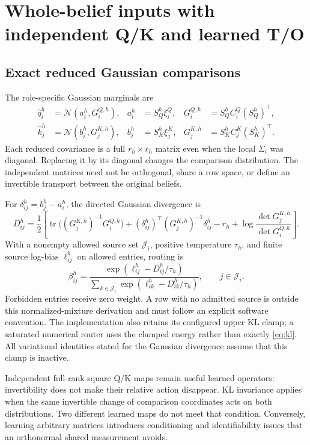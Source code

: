 \documentclass[11pt,letterpaper]{article}
\newcommand{\tr}{\operatorname{tr}}
\begin{document}
\section{Whole-belief inputs with independent Q/K and learned T/O}
\subsection{Exact reduced Gaussian comparisons}
The role-specific Gaussian marginals are
\begin{align}
 \widehat q_i^h&=\mathcal N(a_i^h,G_i^{Q,h}), &
 a_i^h&=S_Q^h\xi_i^Q, &G_i^{Q,h}&=S_Q^h C_i^Q(S_Q^h)^\top,\\
 \widehat k_j^h&=\mathcal N(b_j^h,G_j^{K,h}), &
 b_j^h&=S_K^h\xi_j^K, &G_j^{K,h}&=S_K^h C_j^K(S_K^h)^\top.
 \label{eq:marginals}
\end{align}
Each reduced covariance is a full $r_h\times r_h$ matrix even when the local $\Sigma_i$ was diagonal. Replacing it by its diagonal changes the comparison distribution. The independent matrices need not be orthogonal, share a row space, or define an invertible transport between the original beliefs.

For $\delta_{ij}^h=b_j^h-a_i^h$, the directed Gaussian divergence is
\begin{equation}
 D_{ij}^h=\frac12\left[
 \tr\big((G_j^{K,h})^{-1}G_i^{Q,h}\big)
 +(\delta_{ij}^h)^\top(G_j^{K,h})^{-1}\delta_{ij}^h-r_h
 +\log\frac{\det G_j^{K,h}}{\det G_i^{Q,h}}\right].
 \label{eq:kl}
\end{equation}
With a nonempty allowed source set $\mathcal J_i$, positive temperature $\tau_h$, and finite source log-bias $\ell_{ij}^h$ on allowed entries, routing is
\begin{equation}
 \beta_{ij}^h=
 \frac{\exp(\ell_{ij}^h-D_{ij}^h/\tau_h)}
 {\sum_{k\in\mathcal J_i}\exp(\ell_{ik}^h-D_{ik}^h/\tau_h)},\qquad j\in\mathcal J_i.
 \label{eq:router}
\end{equation}
Forbidden entries receive zero weight. A row with no admitted source is outside this normalized-mixture derivation and must follow an explicit software convention. The implementation also retains its configured upper KL clamp; a saturated numerical router uses the clamped energy rather than exactly \eqref{eq:kl}. All variational identities stated for the Gaussian divergence assume that this clamp is inactive.

Independent full-rank square Q/K maps remain useful learned operators: invertibility does not make their relative action disappear. KL invariance applies when the same invertible change of comparison coordinates acts on both distributions. Two different learned maps do not meet that condition. Conversely, learning arbitrary matrices introduces conditioning and identifiability issues that an orthonormal shared measurement avoids.
\end{document}
